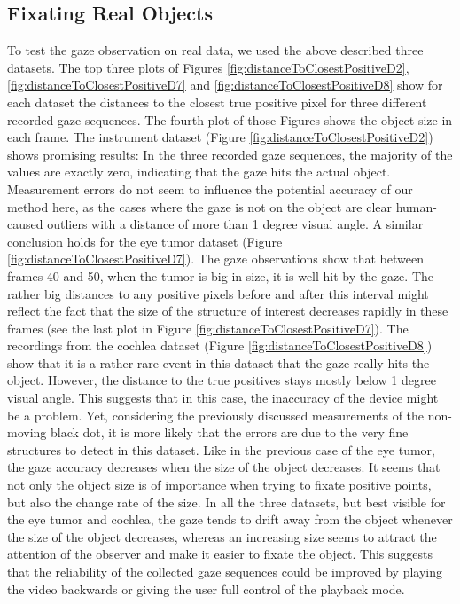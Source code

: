 \subsection{Fixating Real Objects}
To test the gaze observation on real data, we used the above described three datasets. 
The top three plots of Figures \ref{fig:distanceToClosestPositiveD2}, \ref{fig:distanceToClosestPositiveD7} and \ref{fig:distanceToClosestPositiveD8} show for each dataset the distances to the closest true positive pixel for three different recorded gaze sequences. The fourth plot of those Figures shows the object size in each frame.
The instrument dataset (Figure \ref{fig:distanceToClosestPositiveD2}) shows promising results: 
In the three recorded gaze sequences, the majority of the values are exactly zero, indicating that the gaze hits the actual object. 
Measurement errors do not seem to influence the potential accuracy of our method here, as the cases where the gaze is not on the object are clear human-caused outliers with a distance of more than 1 degree visual angle.
A similar conclusion holds for the eye tumor dataset (Figure \ref{fig:distanceToClosestPositiveD7}). 
The gaze observations show that between frames 40 and 50, when the tumor is big in size, it is well hit by the gaze. 
The rather big distances to any positive pixels before and after this interval might reflect the fact that the size of the structure of interest decreases rapidly in these frames (see the last plot in Figure \ref{fig:distanceToClosestPositiveD7}). 
The recordings from the cochlea dataset (Figure \ref{fig:distanceToClosestPositiveD8}) show that it is a rather rare event in this dataset that the gaze really hits the object. 
However, the distance to the true positives stays mostly below 1 degree visual angle. This suggests that in this case, the inaccuracy of the device might be a problem.
Yet, considering the previously discussed measurements of the non-moving black dot, it is more likely that the errors are due to the very fine structures to detect in this dataset. Like in the previous case of the eye tumor, the gaze accuracy decreases when the size of the object decreases. 
It seems that not only the object size is of importance when trying to fixate positive points, but also the change rate of the size. 
In all the three datasets, but best visible for the eye tumor and cochlea, the gaze tends to drift away from the object whenever the size of the object decreases, whereas an increasing size seems to attract the attention of the observer and make it easier to fixate the object. 
This suggests that the reliability of the collected gaze sequences could be improved by playing the video backwards or giving the user full control of the playback mode.

